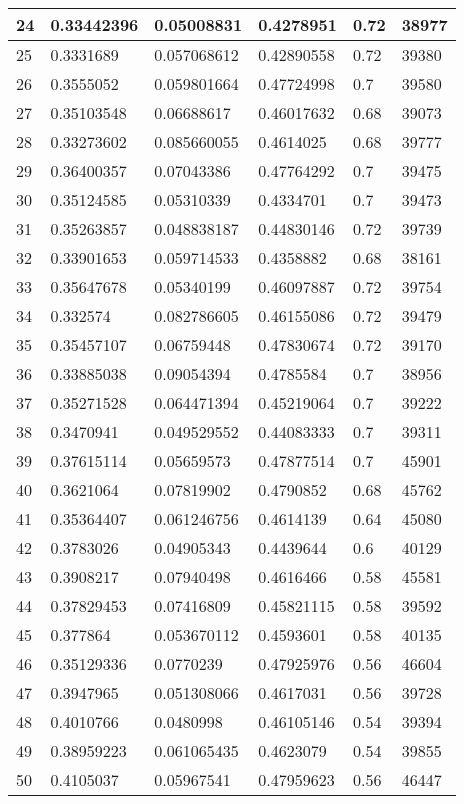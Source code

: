 \begin{longtable}{|l|l|l|l|l|l|}
24 & 0.33442396 & 0.05008831 & 0.4278951 & 0.72 & 38977 \\ \hline 
25 & 0.3331689 & 0.057068612 & 0.42890558 & 0.72 & 39380 \\ \hline 
26 & 0.3555052 & 0.059801664 & 0.47724998 & 0.7 & 39580 \\ \hline 
27 & 0.35103548 & 0.06688617 & 0.46017632 & 0.68 & 39073 \\ \hline 
28 & 0.33273602 & 0.085660055 & 0.4614025 & 0.68 & 39777 \\ \hline 
29 & 0.36400357 & 0.07043386 & 0.47764292 & 0.7 & 39475 \\ \hline 
30 & 0.35124585 & 0.05310339 & 0.4334701 & 0.7 & 39473 \\ \hline 
31 & 0.35263857 & 0.048838187 & 0.44830146 & 0.72 & 39739 \\ \hline 
32 & 0.33901653 & 0.059714533 & 0.4358882 & 0.68 & 38161 \\ \hline 
33 & 0.35647678 & 0.05340199 & 0.46097887 & 0.72 & 39754 \\ \hline 
34 & 0.332574 & 0.082786605 & 0.46155086 & 0.72 & 39479 \\ \hline 
35 & 0.35457107 & 0.06759448 & 0.47830674 & 0.72 & 39170 \\ \hline 
36 & 0.33885038 & 0.09054394 & 0.4785584 & 0.7 & 38956 \\ \hline 
37 & 0.35271528 & 0.064471394 & 0.45219064 & 0.7 & 39222 \\ \hline 
38 & 0.3470941 & 0.049529552 & 0.44083333 & 0.7 & 39311 \\ \hline 
39 & 0.37615114 & 0.05659573 & 0.47877514 & 0.7 & 45901 \\ \hline 
40 & 0.3621064 & 0.07819902 & 0.4790852 & 0.68 & 45762 \\ \hline 
41 & 0.35364407 & 0.061246756 & 0.4614139 & 0.64 & 45080 \\ \hline 
42 & 0.3783026 & 0.04905343 & 0.4439644 & 0.6 & 40129 \\ \hline 
43 & 0.3908217 & 0.07940498 & 0.4616466 & 0.58 & 45581 \\ \hline 
44 & 0.37829453 & 0.07416809 & 0.45821115 & 0.58 & 39592 \\ \hline 
45 & 0.377864 & 0.053670112 & 0.4593601 & 0.58 & 40135 \\ \hline 
46 & 0.35129336 & 0.0770239 & 0.47925976 & 0.56 & 46604 \\ \hline 
47 & 0.3947965 & 0.051308066 & 0.4617031 & 0.56 & 39728 \\ \hline 
48 & 0.4010766 & 0.0480998 & 0.46105146 & 0.54 & 39394 \\ \hline 
49 & 0.38959223 & 0.061065435 & 0.4623079 & 0.54 & 39855 \\ \hline 
50 & 0.4105037 & 0.05967541 & 0.47959623 & 0.56 & 46447 \\ \hline 
\end{longtable}